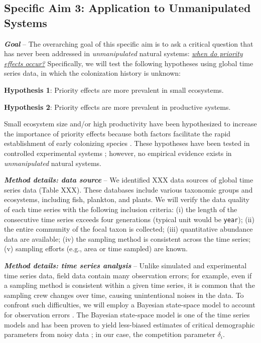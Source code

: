 \documentclass[12pt, class=article, crop=false]{standalone}
\begin{document}
\subsection*{Specific Aim 3: Application to Unmanipulated Systems}

\textbf{\textit{Goal}} -- 
The overarching goal of this specific aim is to ask a critical question that has never been addressed in \textit{unmanipulated} natural systems: \ul{\textit{when do priority effects occur?}} Specifically, we will test the following hypotheses using global time series data, in which the colonization history is unknown:

\textbf{Hypothesis 1}: Priority effects are more prevalent in small ecosystems.

\textbf{Hypothesis 2}: Priority effects are more prevalent in productive systems.

Small ecosystem size and/or high productivity have been hypothesized to increase the importance of priority effects because both factors facilitate the rapid establishment of early colonizing species \citep{fukami_historical_2015}.
These hypotheses have been tested in controlled experimental systems \citep{fukami_assembly_2004, chase_stochastic_2010}; however, no empirical evidence exists in \textit{unmanipulated} natural systems.

\textit{\textbf{Method details: data source}} --
We identified XXX data sources of global time series data (Table XXX).
These databases include various taxonomic groups and ecosystems, including fish, plankton, and plants.
We will verify the data quality of each time series with the following inclusion criteria: (i) the length of the consecutive time series exceeds four generations (typical unit would be \texttt{year}); (ii) the entire community of the focal taxon is collected; (iii) quantitative abundance data are available; (iv) the sampling method is consistent across the time series; (v) sampling efforts (e.g., area or time sampled) are known.

\textit{\textbf{Method details: time series analysis}} --
Unlike simulated and experimental time series data, field data contain many observation errors; for example, even if a sampling method is consistent within a given time series, it is common that the sampling crew changes over time, causing unintentional noises in the data.
To confront such difficulties, we will employ a Bayesian state-space model to account for observation errors \citep{kery_bayesian_2012, amano_hierarchical_2012, anderson_black-swan_2017, terui_metapopulation_2018, terui_intentional_2023}.
The Bayesian state-space model is one of the time series models and has been proven to yield less-biased estimates of critical demographic parameters from noisy data \citep{kery_bayesian_2012}; in our case, the competition parameter $\delta_i$.
\end{document}
